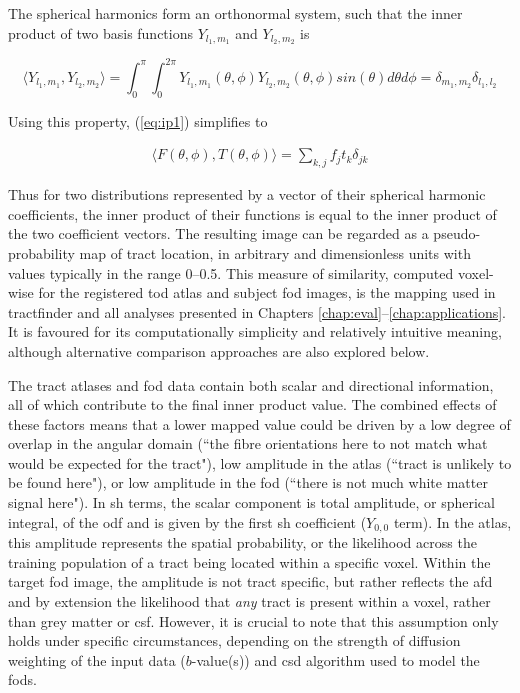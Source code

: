 The spherical harmonics form an orthonormal system, such that the inner product of two basis functions $Y_{l_1,m_1}$ and $Y_{l_2,m_2}$ is

\begin{equation}
  \langle Y_{l_1,m_1}, Y_{l_2,m_2} \rangle
    = \int_0^{\pi} \int_0^{2\pi} Y_{l_1,m_1}(\theta, \phi) Y_{l_2,m_2}(\theta, \phi) sin(\theta) d\theta d\phi
    = \delta_{m_1, m_2} \delta_{l_1, l_2}
\end{equation}

Using this property, (\ref{eq:ip1}) simplifies to

\begin{align}
  \langle F(\theta, \phi), T(\theta, \phi) \rangle = \sum_{k,j} f_j t_k \delta_{jk}
\end{align}\label{eq:ip2}

Thus for two distributions represented by a vector of their spherical harmonic coefficients, the inner product of their functions is equal to the inner product of the two coefficient vectors.
The resulting image can be regarded as a pseudo-probability map of tract location, in arbitrary and dimensionless units with values typically in the range 0--0.5.
This measure of similarity, computed voxel-wise for the registered \gls{tod} atlas and subject \gls{fod} images, is the mapping used in tractfinder and all analyses presented in Chapters \ref{chap:eval}--\ref{chap:applications}.
It is favoured for its computationally simplicity and relatively intuitive meaning, although alternative comparison approaches are also explored below.

The tract atlases and \gls{fod} data contain both scalar and directional information, all of which contribute to the final inner product value.
The combined effects of these factors means that a lower mapped value could be driven by a low degree of overlap in the angular domain (``the fibre orientations here to not match what would be expected for the tract"), low amplitude in the atlas (``tract is unlikely to be found here"), or low amplitude in the \gls{fod} (``there is not much white matter signal here").
In \gls{sh} terms, the scalar component is total amplitude, or spherical integral, of the \gls{odf} and is given by the first \gls{sh} coefficient ($Y_{0,0}$ term).
In the atlas, this amplitude represents the spatial probability, or the likelihood across the training population of a tract being located within a specific voxel.
Within the target \gls{fod} image, the amplitude is not tract specific, but rather reflects the \gls{afd} and by extension the likelihood that \textit{any} tract is present within a voxel, rather than grey matter or \gls{csf}.
However, it is crucial to note that this assumption only holds under specific circumstances, depending on the strength of diffusion weighting of the input data ($b$-value(s)) and \gls{csd} algorithm used to model the \glspl{fod}.

